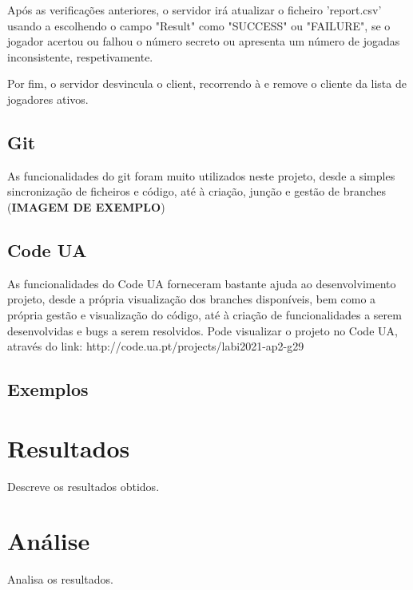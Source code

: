 \documentclass{report}
\begin{document}
Após as verificações anteriores, o servidor irá atualizar o ficheiro 'report.csv' usando a  escolhendo o campo "Result" como "SUCCESS" ou "FAILURE", se o jogador acertou ou falhou o número secreto ou apresenta um número de jogadas inconsistente, respetivamente.

Por fim, o servidor desvincula o client, recorrendo à  e remove o cliente da lista de jogadores ativos.


\section{Git}
\label{sec:git}
As funcionalidades do git foram muito utilizados neste projeto, desde a simples sincronização de ficheiros e código, até à criação, junção e gestão de branches (\textbf{IMAGEM DE EXEMPLO})

\section{Code UA}
\label{sec:git}
As funcionalidades do Code UA forneceram bastante ajuda ao desenvolvimento projeto, desde a própria visualização dos branches disponíveis, bem como a própria gestão e visualização do código, até à criação de funcionalidades a serem desenvolvidas e bugs a serem resolvidos. Pode visualizar o projeto no Code UA, através do link: http://code.ua.pt/projects/labi2021-ap2-g29


\section{Exemplos}


\chapter{Resultados}
\label{chap.resultados}
Descreve os resultados obtidos.

\chapter{Análise}
\label{chap.analise}
Analisa os resultados.
\end{document}
